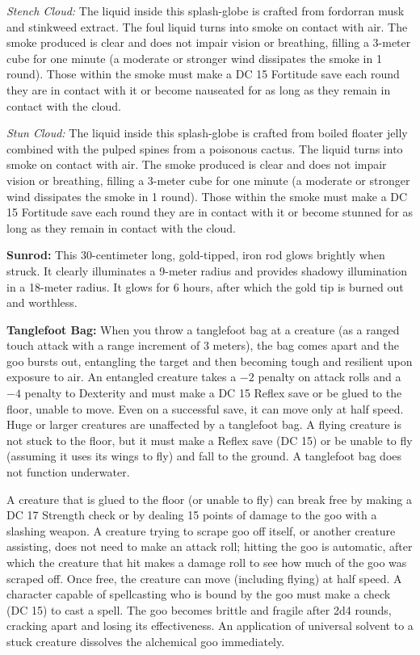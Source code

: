  \textit{Stench Cloud:} The liquid inside this splash-globe is crafted from fordorran musk and stinkweed extract. The foul liquid turns into smoke on contact with air. The smoke produced is clear and does not impair vision or breathing, filling a 3-meter cube for one minute (a moderate or stronger wind dissipates the smoke in 1 round). Those within the smoke must make a DC 15 Fortitude save each round they are in contact with it or become nauseated for as long as they remain in contact with the cloud.

 \textit{Stun Cloud:} The liquid inside this splash-globe is crafted from boiled floater jelly combined with the pulped spines from a poisonous cactus. The liquid turns into smoke on contact with air. The smoke produced is clear and does not impair vision or breathing, filling a 3-meter cube for one minute (a moderate or stronger wind dissipates the smoke in 1 round). Those within the smoke must make a DC 15 Fortitude save each round they are in contact with it or become stunned for as long as they remain in contact with the cloud.

\textbf{Sunrod:} This 30-centimeter long, gold-tipped, iron rod glows brightly when struck. It clearly illuminates a 9-meter radius and provides shadowy illumination in a 18-meter radius. It glows for 6 hours, after which the gold tip is burned out and worthless.

\textbf{Tanglefoot Bag:} When you throw a tanglefoot bag at a creature (as a ranged touch attack with a range increment of 3 meters), the bag comes apart and the goo bursts out, entangling the target and then becoming tough and resilient upon exposure to air. An entangled creature takes a $-2$ penalty on attack rolls and a $-4$ penalty to Dexterity and must make a DC 15 Reflex save or be glued to the floor, unable to move. Even on a successful save, it can move only at half speed. Huge or larger creatures are unaffected by a tanglefoot bag. A flying creature is not stuck to the floor, but it must make a Reflex save (DC 15) or be unable to fly (assuming it uses its wings to fly) and fall to the ground. A tanglefoot bag does not function underwater.

A creature that is glued to the floor (or unable to fly) can break free by making a DC 17 Strength check or by dealing 15 points of damage to the goo with a slashing weapon. A creature trying to scrape goo off itself, or another creature assisting, does not need to make an attack roll; hitting the goo is automatic, after which the creature that hit makes a damage roll to see how much of the goo was scraped off. Once free, the creature can move (including flying) at half speed. A character capable of spellcasting who is bound by the goo must make a  check (DC 15) to cast a spell. The goo becomes brittle and fragile after 2d4 rounds, cracking apart and losing its effectiveness. An application of universal solvent to a stuck creature dissolves the alchemical goo immediately.

